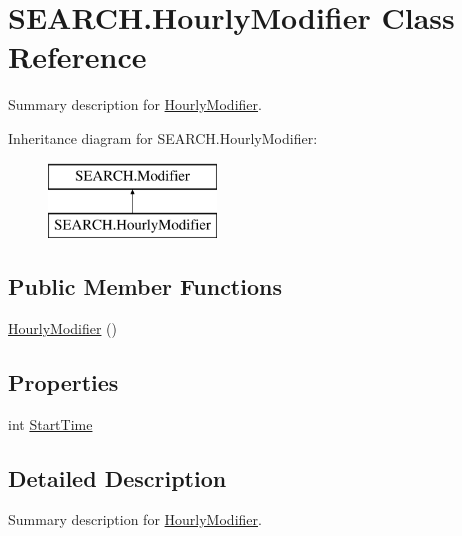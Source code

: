 \hypertarget{class_s_e_a_r_c_h_1_1_hourly_modifier}{\section{S\-E\-A\-R\-C\-H.\-Hourly\-Modifier Class Reference}
\label{class_s_e_a_r_c_h_1_1_hourly_modifier}
}


Summary description for \hyperlink{class_s_e_a_r_c_h_1_1_hourly_modifier}{Hourly\-Modifier}.  


Inheritance diagram for S\-E\-A\-R\-C\-H.\-Hourly\-Modifier\-:\begin{figure}[H]
\begin{center}
\leavevmode
\includegraphics[height=2.000000cm]{class_s_e_a_r_c_h_1_1_hourly_modifier}
\end{center}
\end{figure}
\subsection*{Public Member Functions}
\begin{DoxyCompactItemize}
\item 
\hyperlink{class_s_e_a_r_c_h_1_1_hourly_modifier_a90843d950db0197f9ef151fabbc8fe42}{Hourly\-Modifier} ()
\end{DoxyCompactItemize}
\subsection*{Properties}
\begin{DoxyCompactItemize}
\item 
int \hyperlink{class_s_e_a_r_c_h_1_1_hourly_modifier_a2b71dd8284a1adbe21f5831522240497}{Start\-Time}
\end{DoxyCompactItemize}


\subsection{Detailed Description}
Summary description for \hyperlink{class_s_e_a_r_c_h_1_1_hourly_modifier}{Hourly\-Modifier}. 



